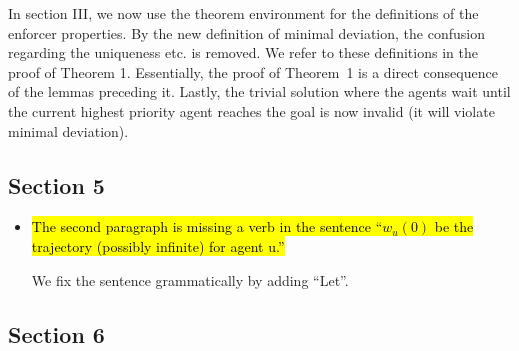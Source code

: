 \documentclass{article}[12pt]
\begin{document}
\begin{itemize}
In section III, we now use the theorem environment for the definitions of the enforcer properties. 
By the new definition of minimal deviation, the confusion regarding the uniqueness etc. is removed. We refer to these definitions in the proof of Theorem 1. Essentially, the proof of Theorem~1 is a direct consequence of the lemmas preceding it. Lastly, the trivial solution where the agents wait until the current highest priority agent reaches the goal is now invalid (it will violate minimal deviation).

\end{itemize}

\subsection*{Section 5}
\begin{itemize}
\item \hl{The second paragraph is missing a verb in the sentence ``$w_u (0)$ be the trajectory (possibly infinite) for agent u.''}

We fix the sentence grammatically by adding “Let”. 
\end{itemize}

\subsection*{Section 6}
\end{document}
